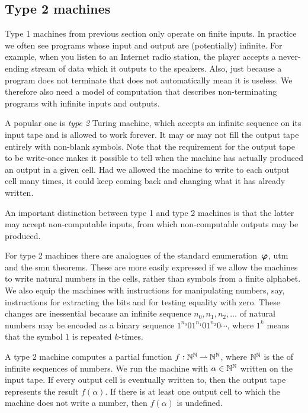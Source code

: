 \subsection{Type 2 machines}
\label{sec:type-2}

Type 1 machines from previous section only operate on finite inputs.
In practice we often see programs whose input and output are
(potentially) infinite. For example, when you listen to an Internet
radio station, the player accepts a never-ending stream of data which
it outputs to the speakers. Also, just because a program does not
terminate that does not automatically mean it is useless. We therefore
also need a model of computation that describes non-terminating
programs with infinite inputs and outputs.

A popular one is \emph{type 2} Turing machine, which accepts an
infinite sequence on its input tape and is allowed to work forever. It
may or may not fill the output tape entirely with non-blank symbols.
Note that the requirement for the output tape to be write-once makes
it possible to tell when the machine has actually produced an output
in a given cell. Had we allowed the machine to write to each output
cell many times, it could keep coming back and changing what it has
already written.

An important distinction between type 1 and type 2 machines is that
the latter may accept non-computable inputs, from which non-computable
outputs may be produced.

For type 2 machines there are analogues of the standard
enumeration~$\text{\boldmath{$\varphi$}}$, utm and the smn theorems. These are more easily
expressed if we allow the machines to write natural numbers in the
cells, rather than symbols from a finite alphabet. We also equip the
machines with instructions for manipulating numbers, say, instructions
for extracting the bits and for testing equality with zero. These
changes are inessential because an infinite sequence $n_0, n_1, n_2,
\ldots$ of natural numbers may be encoded as a binary sequence
$1^{n_0}01^{n_1}01^{n_2}0\cdots$, where $1^k$ means that the symbol
$1$ is repeated $k$-times.

A type 2 machine computes a partial function $f : \mathbb{N}^{\mathbb{N}} \mathbin{\rightharpoonup}
\mathbb{N}^{\mathbb{N}}$, where $\mathbb{N}^{\mathbb{N}}$ is the  of infinite
sequences of numbers. We run the machine with $\alpha \in \mathbb{N}^{\mathbb{N}}$
written on the input tape. If every output cell is eventually written
to, then the output tape represents the result $f(\alpha)$. If there is
at least one output cell to which the machine does not write a number,
then $f(\alpha)$ is undefined.

